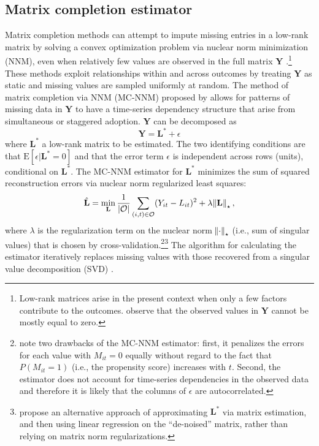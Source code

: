 \documentclass[12pt]{article}
\newcommand{\E}{\mathrm{E}}
\begin{document}
\subsection{Matrix completion estimator}

Matrix completion methods can attempt to impute missing entries in a low-rank matrix by solving a convex optimization problem via nuclear norm minimization (NNM), even when relatively few values are observed in the full matrix $\mathbf{Y}$ \citep[e.g.,][]{candes2009exact,candes2010matrix}.\footnote{Low-rank matrices arise in the present context when only a few factors contribute to the outcomes. \citet{candes2009exact} observe that the observed values in $\mathbf{Y}$ cannot be mostly equal to zero.} These methods exploit relationships within and across outcomes by treating $\mathbf{Y}$ as static and missing values are sampled uniformly at random. The method of matrix completion via NNM (MC-NNM) proposed by \citet{athey2017matrix} allows for patterns of missing data in $\mathbf{Y}$ to have a time-series dependency structure that arise from simultaneous or staggered adoption. $\mathbf{Y}$ can be decomposed as 
%
\begin{equation}
\mathbf{Y} = \mathbf{L^{*}} + \epsilon \label{eq:mc-Y}
\end{equation}
%
where $\mathbf{L^{*}}$ a low-rank matrix to be estimated. The two identifying conditions are that $\E[\epsilon | \mathbf{L^{*}} = 0]$ and that the error term $\epsilon$ is independent across rows (units), conditional on $\mathbf{L^{*}}$. The MC-NNM estimator for $\mathbf{L^{*}}$ minimizes the sum of squared reconstruction errors via nuclear norm regularized least squares:
%
\begin{equation}
\hat{\mathbf{L}} = \min_{\mathbf{L}} \frac{1}{|\mathcal{O}|} \sum_{(i,t) \in \mathcal{O}} (Y_{it} - L_{it})^2 + \lambda \norm{\mathbf{L}}_\star,
\end{equation}
%
where $\lambda$ is the regularization term on the nuclear norm $\norm{\cdot}_\star$ (i.e., sum of singular values) that is chosen by cross-validation.\footnote{\citet{athey2017matrix} note two drawbacks of the MC-NNM estimator: first, it penalizes the errors for each value with $M_{it} = 0$ equally without regard to the fact that $P(M_{it} = 1)$ (i.e., the propensity score) increases with $t$. Second, the estimator does not account for time-series dependencies in the observed data and therefore it is likely that the columns of $\epsilon$ are autocorrelated.}\footnote{\citet{amjad2018robust} propose an alternative approach of approximating $\mathbf{L^{*}}$ via matrix estimation, and then using linear regression on the ``de-noised'' matrix, rather than relying on matrix norm regularizations.} The algorithm for calculating the estimator iteratively replaces missing values with those recovered from a singular value decomposition (SVD) \citep{mazumder2010spectral}. 
\end{document}
